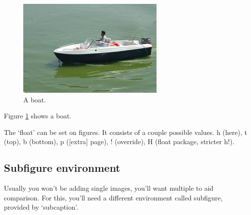 \documentclass{article}
\begin{document}
\begin{figure}[H]
	\includegraphics[width=\linewidth]{boat.jpg}
	\caption{A boat.}
	\label{fig:boat1}
\end{figure}

Figure \ref{fig:boat1} shows a boat.

The `float' can be set on figures. It consists of a couple possible values.
h (here), t (top), b (bottom), p ([extra] page), ! (override), H (float package, stricter h!).

\subsection{Subfigure environment}

Usually you won't be adding single images, you'll want multiple to aid comparison.
For this, you'll need a different environment called subfigure, provided by `subcaption'.
\end{document}
